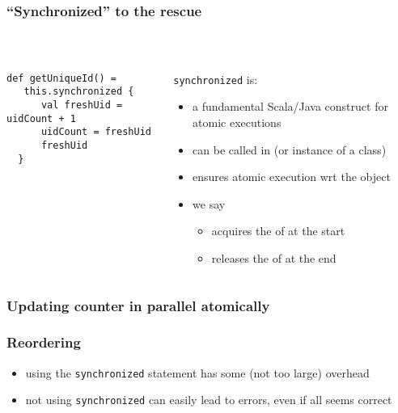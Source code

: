 \documentclass[aspectratio=169]{beamer}
\begin{document}
\begin{frame}[fragile]\frametitle{``Synchronized'' to the rescue}
~\\[-8mm]
\begin{columns}
\begin{column}{0.49\textwidth}
\begin{lstlisting}[emph={printUniqueIds,sleep,log,thread,join}]
def getUniqueId() =
   this.synchronized {
      val freshUid = uidCount + 1
      uidCount = freshUid
      freshUid
  }
\end{lstlisting}
\end{column}
\begin{column}{0.49\textwidth}
\texttt{synchronized} is:
\begin{itemize}
  \item a fundamental Scala/Java construct for atomic executions
  \item can be called in  (or instance of a class)
  \item ensures atomic execution wrt the object
  \item we say 
    \begin{itemize}
      \item \alert{acquires} the  of  at the start
      \item \alert{releases} the  of  at the end
    \end{itemize}
\end{itemize}
\end{column}
\end{columns}
\end{frame}


\begin{frame}\frametitle{Updating counter in parallel atomically}
  \centering  
\end{frame}

\begin{frame}%
  \centering
\end{frame}


\begin{frame}\frametitle{Reordering}
\centering
\begin{itemize}
  \item using the \texttt{synchronized} statement has some (not too large) overhead
  \item not using \texttt{synchronized} can easily lead to errors, even if all seems correct
\end{itemize}

{\large {}}
\end{frame}
\end{document}
